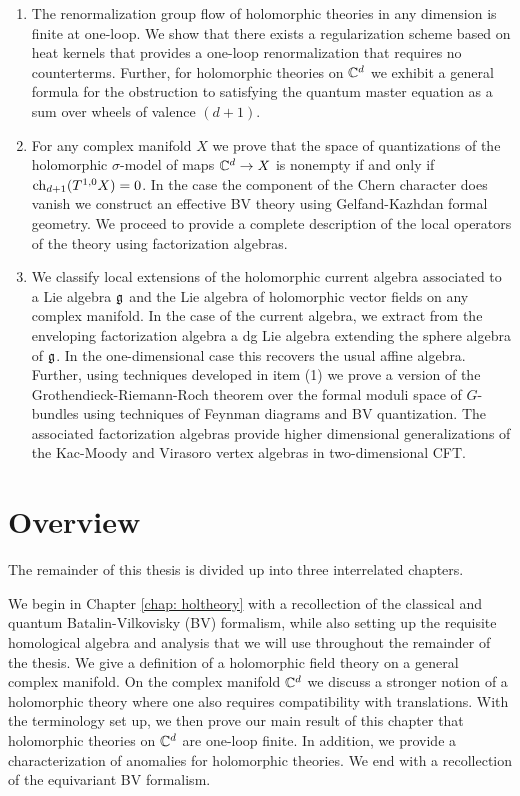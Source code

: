 \begin{enumerate}
\item The renormalization group flow of holomorphic theories in any dimension is finite at one-loop.
We show that there exists a regularization scheme based on heat kernels that provides a one-loop renormalization that requires no counterterms. 
Further, for holomorphic theories on $\mathbb C^d$ we exhibit a general formula for the obstruction to satisfying the quantum master equation as a sum over wheels of valence $(d+1)$. 

\item For any complex manifold $X$ we prove that the space of quantizations of the holomorphic $\sigma$-model of maps $\mathbb C^d \to X$ is nonempty if and only if ${\rm ch}_{d+1}(T^{1,0}X) = 0$. 
In the case the component of the Chern character does vanish we construct an effective BV theory using Gelfand-Kazhdan formal geometry.
We proceed to provide a complete description of the local operators of the theory using factorization algebras.

\item We classify local extensions of the holomorphic current algebra associated to a Lie algebra $\mathfrak g$ and the Lie algebra of holomorphic vector fields on any complex manifold.
In the case of the current algebra, we extract from the enveloping factorization algebra a dg Lie algebra extending the sphere algebra of $\mathfrak g$.
In the one-dimensional case this recovers the usual affine algebra.
Further, using techniques developed in item (1) we prove a version of the Grothendieck-Riemann-Roch theorem over the formal moduli space of $G$-bundles using techniques of Feynman diagrams and BV quantization.
The associated factorization algebras provide higher dimensional generalizations of the Kac-Moody and Virasoro vertex algebras in two-dimensional CFT. 

\end{enumerate}

\section{Overview}

The remainder of this thesis is divided up into three interrelated chapters. 

We begin in Chapter \ref{chap: holtheory} with a recollection of the classical and quantum Batalin-Vilkovisky (BV) formalism, while also setting up the requisite homological algebra and analysis that we will use throughout the remainder of the thesis. 
We give a definition of a holomorphic field theory on a general complex manifold. 
On the complex manifold $\mathbb C^d$ we discuss a stronger notion of a holomorphic theory where one also requires compatibility with translations. 
With the terminology set up, we then prove our main result of this chapter that holomorphic theories on $\mathbb C^d$ 
are one-loop finite.
In addition, we provide a characterization of anomalies for holomorphic theories. 
We end with a recollection of the equivariant BV formalism. 

